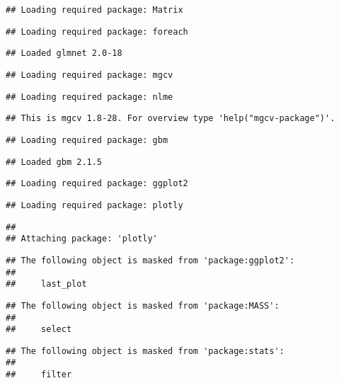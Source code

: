 \documentclass[]{article}
\begin{document}
\begin{verbatim}
## Loading required package: Matrix
\end{verbatim}

\begin{verbatim}
## Loading required package: foreach
\end{verbatim}

\begin{verbatim}
## Loaded glmnet 2.0-18
\end{verbatim}

\begin{verbatim}
## Loading required package: mgcv
\end{verbatim}

\begin{verbatim}
## Loading required package: nlme
\end{verbatim}

\begin{verbatim}
## This is mgcv 1.8-28. For overview type 'help("mgcv-package")'.
\end{verbatim}

\begin{verbatim}
## Loading required package: gbm
\end{verbatim}

\begin{verbatim}
## Loaded gbm 2.1.5
\end{verbatim}

\begin{verbatim}
## Loading required package: ggplot2
\end{verbatim}

\begin{verbatim}
## Loading required package: plotly
\end{verbatim}

\begin{verbatim}
## 
## Attaching package: 'plotly'
\end{verbatim}

\begin{verbatim}
## The following object is masked from 'package:ggplot2':
## 
##     last_plot
\end{verbatim}

\begin{verbatim}
## The following object is masked from 'package:MASS':
## 
##     select
\end{verbatim}

\begin{verbatim}
## The following object is masked from 'package:stats':
## 
##     filter
\end{verbatim}
\end{document}
